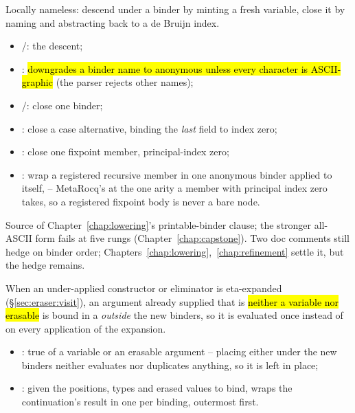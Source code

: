 \begin{definition}
\label{def:Erasure-mkLambda}
\leanok
{} Locally nameless: descend under a binder by minting a fresh variable, close it by
naming and abstracting back to a de Bruijn index.
\begin{itemize}
\item {}/: the descent;
\item {}: \hl{downgrades a binder name to anonymous unless every character is
ASCII-graphic} (the parser rejects other names);
\item {}/: close one binder;
\item {}: close a case alternative, binding the \emph{last} field to index zero;
\item {}: close one fixpoint member, principal-index zero;
\item {}: wrap a registered recursive member in one anonymous binder applied to
itself,  -- MetaRocq's  at the one arity a
member with principal index zero takes, so a registered fixpoint body is never a bare
 node.
\end{itemize}
\end{definition}

\begin{remark}
 Source of Chapter~\ref{chap:lowering}'s printable-binder clause; the stronger
all-ASCII form fails at five rungs (Chapter~\ref{chap:capstone}). Two doc comments still hedge on
binder order; Chapters~\ref{chap:lowering},~\ref{chap:refinement} settle it, but the hedge
remains.
\end{remark}

\begin{definition}
\label{def:Erasure-withEtaPrefixLets}
\leanok
{} When an under-applied constructor or eliminator is eta-expanded
(\S\ref{sec:eraser:visit}), an argument already supplied that is \hl{neither a variable nor
erasable} is bound in a  \emph{outside} the new binders, so it is evaluated once
instead of on every application of the expansion.
\begin{itemize}
\item {}: true of a variable or an erasable argument -- placing either under
the new binders neither evaluates nor duplicates anything, so it is left in place;
\item {}: given the positions, types and erased values to bind, wraps the
continuation's result in one  per binding, outermost first.
\end{itemize}
\end{definition}

